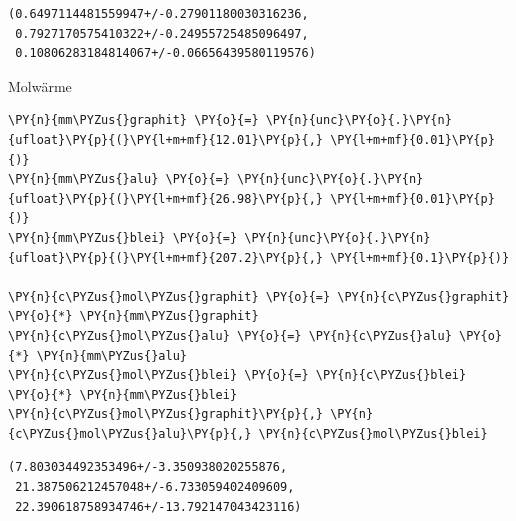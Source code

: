             \begin{tcolorbox}[breakable, size=fbox, boxrule=.5pt, pad at break*=1mm, opacityfill=0]
\begin{Verbatim}[commandchars=\\\{\}]
(0.6497114481559947+/-0.27901180030316236,
 0.7927170575410322+/-0.24955725485096497,
 0.10806283184814067+/-0.06656439580119576)
\end{Verbatim}
\end{tcolorbox}
        
    Molwärme

    \begin{tcolorbox}[breakable, size=fbox, boxrule=1pt, pad at break*=1mm,colback=cellbackground, colframe=cellborder]
\begin{Verbatim}[commandchars=\\\{\}]
\PY{n}{mm\PYZus{}graphit} \PY{o}{=} \PY{n}{unc}\PY{o}{.}\PY{n}{ufloat}\PY{p}{(}\PY{l+m+mf}{12.01}\PY{p}{,} \PY{l+m+mf}{0.01}\PY{p}{)}
\PY{n}{mm\PYZus{}alu} \PY{o}{=} \PY{n}{unc}\PY{o}{.}\PY{n}{ufloat}\PY{p}{(}\PY{l+m+mf}{26.98}\PY{p}{,} \PY{l+m+mf}{0.01}\PY{p}{)}
\PY{n}{mm\PYZus{}blei} \PY{o}{=} \PY{n}{unc}\PY{o}{.}\PY{n}{ufloat}\PY{p}{(}\PY{l+m+mf}{207.2}\PY{p}{,} \PY{l+m+mf}{0.1}\PY{p}{)}

\PY{n}{c\PYZus{}mol\PYZus{}graphit} \PY{o}{=} \PY{n}{c\PYZus{}graphit} \PY{o}{*} \PY{n}{mm\PYZus{}graphit}
\PY{n}{c\PYZus{}mol\PYZus{}alu} \PY{o}{=} \PY{n}{c\PYZus{}alu} \PY{o}{*} \PY{n}{mm\PYZus{}alu}
\PY{n}{c\PYZus{}mol\PYZus{}blei} \PY{o}{=} \PY{n}{c\PYZus{}blei} \PY{o}{*} \PY{n}{mm\PYZus{}blei}
\PY{n}{c\PYZus{}mol\PYZus{}graphit}\PY{p}{,} \PY{n}{c\PYZus{}mol\PYZus{}alu}\PY{p}{,} \PY{n}{c\PYZus{}mol\PYZus{}blei}
\end{Verbatim}
\end{tcolorbox}

            \begin{tcolorbox}[breakable, size=fbox, boxrule=.5pt, pad at break*=1mm, opacityfill=0]
\begin{Verbatim}[commandchars=\\\{\}]
(7.803034492353496+/-3.350938020255876,
 21.387506212457048+/-6.733059402409609,
 22.390618758934746+/-13.792147043423116)
\end{Verbatim}
\end{tcolorbox}
        
